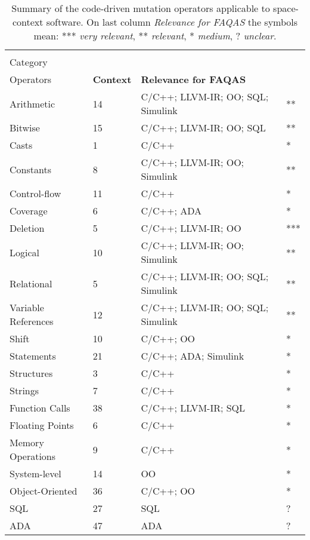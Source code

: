 
\clearpage

\setlength\LTleft{0pt}
\setlength\LTright{0pt}
\small 
\begin{longtable}{@{\extracolsep{\fill}}|l|l|l|l|@{}}
\caption{\normalsize Summary of the code-driven mutation operators applicable to space-context software. On last column \emph{Relevance for FAQAS} the symbols mean: *** \textit{very relevant}, ** \textit{relevant}, * \textit{medium}, ? \textit{unclear}.}
\label{table:codeoperatorssummary} \\
\hline

	\textbf{\begin{tabular}[c]{@{}l@{}}Operator\\Category\end{tabular}}	&	\textbf{\begin{tabular}[c]{@{}l@{}}Number of\\Operators\end{tabular}}	&	\textbf{Context}	&	\textbf{Relevance for FAQAS}\\

\hline
	Arithmetic			&	14	&	C/C++; LLVM-IR; OO; SQL; Simulink	& **\\
	Bitwise				&	15	&	C/C++; LLVM-IR; OO; SQL 			& **\\
	Casts				&	1	&	C/C++ 								& *\\
	Constants			&	8	&	C/C++; LLVM-IR; OO; Simulink 		& **\\
	Control-flow		&	11	&	C/C++ & *\\
	Coverage			&	6	&	C/C++; ADA & *\\
	Deletion			&	5	&	C/C++; LLVM-IR; OO & ***\\
	Logical				&	10	&	C/C++; LLVM-IR; OO; Simulink & **\\
	Relational			&	5	&	C/C++; LLVM-IR; OO; SQL; Simulink & **\\
	Variable References	&	12	&	C/C++; LLVM-IR; OO; SQL; Simulink & **\\
	Shift				&	10	&	C/C++; OO & *\\
	Statements			&	21	&	C/C++; ADA; Simulink & *\\
	Structures			&	3	&	C/C++ & *\\
	Strings				&	7	&	C/C++ & *\\
	Function Calls		&	38	&	C/C++; LLVM-IR; SQL & *\\
	Floating Points		&	6	&	C/C++ & *\\
	Memory Operations	&	9	&	C/C++ & *\\
	System-level		&	14	&	OO & *\\
	Object-Oriented		&	36	&	C/C++; OO & *\\
	SQL					&	27	&	SQL & ?\\
	ADA					&	47	&	ADA & ?\\
\bottomrule                                                             
\end{longtable}
\normalsize